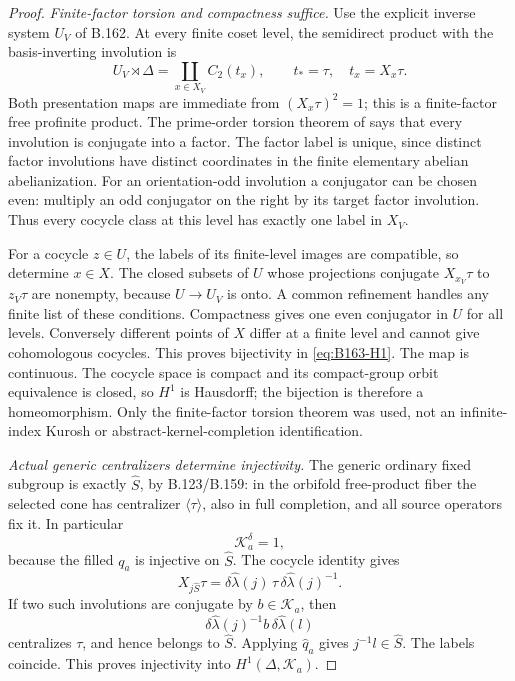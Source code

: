 \begin{proof}
\emph{Finite-factor torsion and compactness suffice.}
Use the explicit inverse system $U_V$ of B.162. At every finite coset
level, the semidirect product with the basis-inverting involution is
\[
 U_V\rtimes\Delta=\coprod_{x\in X_V}C_2(t_x),\qquad
 t_*=\tau,\quad t_x=X_x\tau.
\]
Both presentation maps are immediate from $(X_x\tau)^2=1$; this is
a finite-factor free profinite product. The prime-order torsion theorem
of \citet[Theorem A\(^{\prime}\)]{A_HR1985} says that every involution
is conjugate into a factor. The factor label is unique, since distinct
factor involutions have distinct coordinates in the finite elementary
abelian abelianization. For an orientation-odd involution a conjugator
can be chosen even: multiply an odd conjugator on the right by its
target factor involution. Thus every cocycle class at this level has
exactly one label in $X_V$.

For a cocycle $z\in U$, the labels of its finite-level images are
compatible, so determine $x\in X$. The closed subsets of $U$ whose
projections conjugate $X_{x_V}\tau$ to $z_V\tau$ are nonempty, because
$U\to U_V$ is onto. A common refinement handles any finite list of
these conditions. Compactness gives one even conjugator in $U$ for
all levels. Conversely different points of $X$ differ at a finite
level and cannot give cohomologous cocycles. This proves bijectivity
in \eqref{eq:B163-H1}. The map is continuous. The cocycle space is
compact and its compact-group orbit equivalence is closed, so $H^1$
is Hausdorff; the bijection is therefore a homeomorphism. Only the
finite-factor torsion theorem was used, not an infinite-index Kurosh
or abstract-kernel-completion identification.

\emph{Actual generic centralizers determine injectivity.}
The generic ordinary fixed subgroup is exactly $\widehat S$, by
B.123/B.159: in the orbifold free-product fiber the selected cone has
centralizer $\langle\tau\rangle$, also in full completion, and all
source operators fix it. In particular
\[
 \mathcal K_a^\delta=1,
\]
because the filled $q_a$ is injective on $\widehat S$.
The cocycle identity gives
\[
 X_{j\widehat S}\tau
   =\delta\widehat\lambda(j)\,\tau\,
                   \delta\widehat\lambda(j)^{-1}.
\]
If two such involutions are conjugate by $b\in\mathcal K_a$, then
\[
 \delta\widehat\lambda(j)^{-1}b\,
                   \delta\widehat\lambda(l)
\]
centralizes $\tau$, and hence belongs to $\widehat S$. Applying
$\widehat q_a$ gives $j^{-1}l\in\widehat S$. The labels coincide.
This proves injectivity into $H^1(\Delta,\mathcal K_a)$.


\end{proof}
